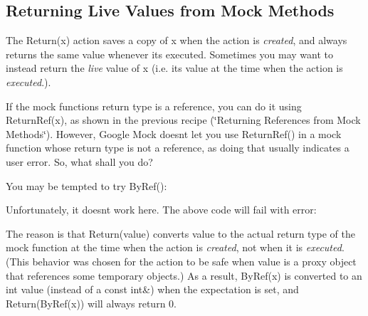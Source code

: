 \subsection*{Returning Live Values from Mock Methods}

The {\ttfamily Return(x)} action saves a copy of {\ttfamily x} when the action is {\itshape created}, and always returns the same value whenever it\textquotesingle{}s executed. Sometimes you may want to instead return the {\itshape live} value of {\ttfamily x} (i.\+e. its value at the time when the action is {\itshape executed}.).

If the mock function\textquotesingle{}s return type is a reference, you can do it using {\ttfamily Return\+Ref(x)}, as shown in the previous recipe (\char`\"{}\+Returning References
from Mock Methods\char`\"{}). However, Google Mock doesn\textquotesingle{}t let you use {\ttfamily Return\+Ref()} in a mock function whose return type is not a reference, as doing that usually indicates a user error. So, what shall you do?

You may be tempted to try {\ttfamily By\+Ref()}\+:


\begin{DoxyCode}{0}
\DoxyCodeLine{}
\DoxyCodeLine{\};}
\end{DoxyCode}


Unfortunately, it doesn\textquotesingle{}t work here. The above code will fail with error\+:


\begin{DoxyCode}{0}
\end{DoxyCode}


The reason is that {\ttfamily Return(value)} converts {\ttfamily value} to the actual return type of the mock function at the time when the action is {\itshape created}, not when it is {\itshape executed}. (This behavior was chosen for the action to be safe when {\ttfamily value} is a proxy object that references some temporary objects.) As a result, {\ttfamily By\+Ref(x)} is converted to an {\ttfamily int} value (instead of a {\ttfamily const int\&}) when the expectation is set, and {\ttfamily Return(\+By\+Ref(x))} will always return 0.

